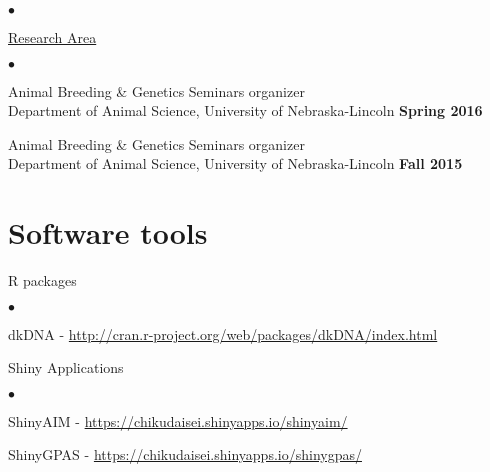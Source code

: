 \documentclass[margin,line,10pt]{res}
\newenvironment{list1}{
  \begin{list}{\ding{113}}{%
      \setlength{\itemsep}{0in}
      \setlength{\parsep}{0in} \setlength{\parskip}{0in}
      \setlength{\topsep}{0in} \setlength{\partopsep}{0in} 
      \setlength{\leftmargin}{0.17in}}}{\end{list}}
\newenvironment{list2}{
  \begin{list}{$\bullet$}{%
      \setlength{\itemsep}{0in}
      \setlength{\parsep}{0in} \setlength{\parskip}{0in}
      \setlength{\topsep}{0in} \setlength{\partopsep}{0in} 
      \setlength{\leftmargin}{0.2in}}}{\end{list}}
\begin{document}
\begin{resume}
\begin{list2}
  \vspace{0.3cm}

\end{list2}


\begin{flushleft}
\hspace{0.3cm} \underline{Research Area}
\end{flushleft}
\begin{list2}
\item Animal Breeding \& Genetics Seminars organizer \\
  Department of Animal Science, University of Nebraska-Lincoln   \hfill \textbf{Spring 2016}\\

\item Animal Breeding \& Genetics Seminars organizer \\
  Department of Animal Science, University of Nebraska-Lincoln   \hfill \textbf{Fall 2015}\\
\end{list2}






\vspace{0.5cm}
\section{\sc Software tools} 
\begin{list1}
\item[] R packages
\begin{list2}
\item dkDNA - \textcolor{blue}{\href{http://cran.r-project.org/web/packages/dkDNA/index.html}{http://cran.r-project.org/web/packages/dkDNA/index.html}}
\end{list2}


\vspace{0.3cm}
\item[] Shiny Applications
  \begin{list2}
  \item ShinyAIM - \textcolor{blue}{\href{https://chikudaisei.shinyapps.io/shinyaim/}{https://chikudaisei.shinyapps.io/shinyaim/}}

    \vspace{0.3cm}
    
\item ShinyGPAS - \textcolor{blue}{\href{https://chikudaisei.shinyapps.io/shinygpas/}{https://chikudaisei.shinyapps.io/shinygpas/}} 
\end{list2}




\end{list1}
\end{resume}
\end{document}
